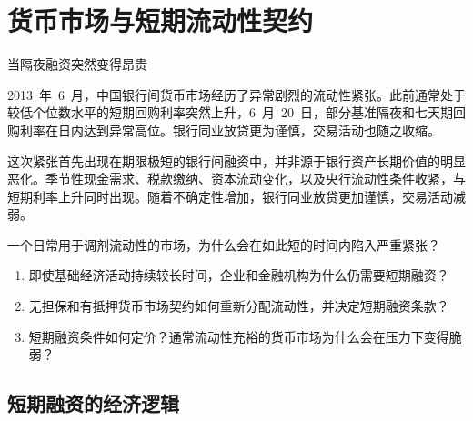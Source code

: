 \chapter{货币市场与短期流动性契约}
\label{chap:Money_Markets_and_Short_Term_Liquidity_Contracts}

\begin{openingcase}{当隔夜融资突然变得昂贵}

2013~年~6~月，中国银行间货币市场经历了异常剧烈的流动性紧张。此前通常处于较低个位数水平的短期回购利率突然上升，6~月~20~日，部分基准隔夜和七天期回购利率在日内达到异常高位。银行同业放贷更为谨慎，交易活动也随之收缩。

这次紧张首先出现在期限极短的银行间融资中，并非源于银行资产长期价值的明显恶化。季节性现金需求、税款缴纳、资本流动变化，以及央行流动性条件收紧，与短期利率上升同时出现。随着不确定性增加，银行同业放贷更加谨慎，交易活动减弱。

一个日常用于调剂流动性的市场，为什么会在如此短的时间内陷入严重紧张？

\end{openingcase}

\begin{tcolorbox}[
  enhanced,
  colback=FinanceBlue!6,
  colframe=FinanceBlue,
  boxrule=0.6pt,
  sharp corners,
  left=8pt,
  right=8pt,
  top=7pt,
  bottom=7pt,
  before skip=1em,
  after skip=1.6em,
  title=\textbf{核心问题},
  coltitle=white,
  colbacktitle=FinanceBlue,
  fonttitle=\bfseries,
  attach boxed title to top left={xshift=6pt,yshift=-2mm},
  boxed title style={
    boxrule=0pt,
    sharp corners,
    left=5pt,
    right=5pt,
    top=2pt,
    bottom=2pt
  }
]
\begin{enumerate}[
  leftmargin=*,
  label=\textcolor{FinanceBlue}{\textbf{\arabic*.}},
  itemsep=0.55em,
  topsep=0.2em
]

\item 即使基础经济活动持续较长时间，企业和金融机构为什么仍需要短期融资？

\item 无担保和有抵押货币市场契约如何重新分配流动性，并决定短期融资条款？

\item 短期融资条件如何定价？通常流动性充裕的货币市场为什么会在压力下变得脆弱？

\end{enumerate}
\end{tcolorbox}

\section{短期融资的经济逻辑}

